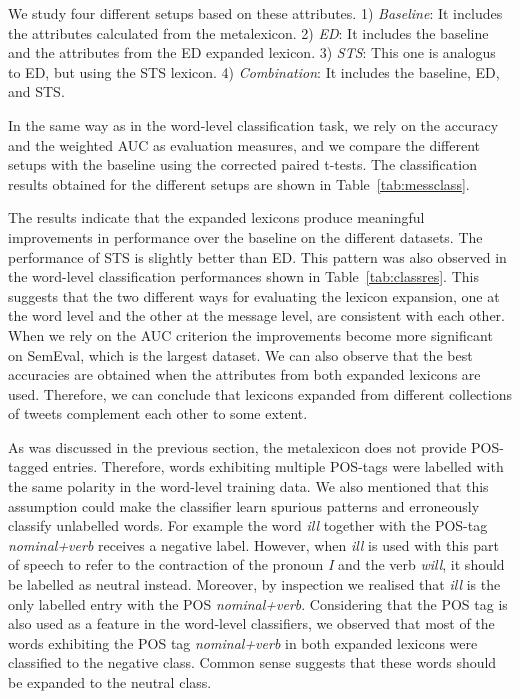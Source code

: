 \documentclass{sig-alternate}
\begin{document}
We study four different setups based on these attributes. 1) \emph{Baseline}: It includes the attributes calculated from the metalexicon.  2) \emph{ED}: It includes the baseline and the attributes from the ED expanded lexicon. 3) \emph{STS}: This one is analogus to ED, but using the STS lexicon. 4) \emph{Combination}: It includes the baseline, ED, and STS.

In the same way as in the word-level classification task, we rely on the accuracy and the weighted AUC as evaluation measures, and we compare the different setups with the baseline using the corrected paired t-tests. The classification results obtained for the different setups are shown in Table~\ref{tab:messclass}.


The results indicate that the expanded lexicons produce meaningful improvements in performance over the baseline on the different datasets. The performance of STS is slightly better than ED. This pattern was also observed in the word-level classification performances shown in Table~\ref{tab:classres}. This suggests that the two different ways for evaluating the lexicon expansion, one at the word level and the other at the message level, are consistent with each other. When we rely on the AUC criterion the improvements become more significant on SemEval, which is the largest dataset. We can also observe that the best accuracies are obtained when the attributes from both expanded lexicons are used. Therefore, we can conclude that lexicons expanded from different collections of tweets complement each other to some extent.  



As was discussed in the previous section, the metalexicon does not provide POS-tagged entries. Therefore, words exhibiting  multiple POS-tags were labelled with the same polarity in the word-level training data. We also mentioned that this assumption could make the classifier learn spurious patterns and erroneously classify unlabelled words. For example the word \emph{ill} together with the POS-tag \emph{nominal+verb} receives a negative label. However, when \emph{ill} is used with this part of speech to refer to the contraction of the pronoun \emph{I} and the verb \emph{will}, it should be labelled as neutral instead. Moreover, by inspection we realised that \emph{ill} is the only labelled entry with the POS \emph{nominal+verb}. Considering that the POS tag is also used as a feature in the word-level classifiers, we observed that most of the words exhibiting the POS tag \emph{nominal+verb} in both expanded lexicons were classified to the negative class. Common sense suggests that these words should be expanded to the neutral class.
\end{document}
